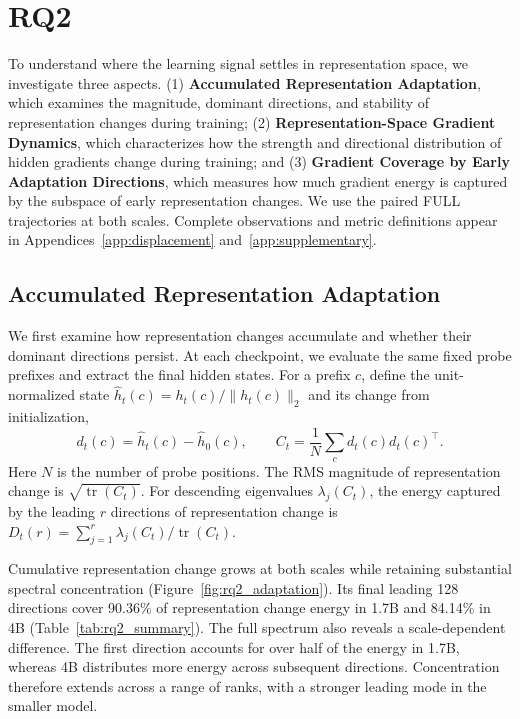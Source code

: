 \section{RQ2}
\label{sec:RQ2}
To understand where the learning signal settles in representation space, we investigate three aspects.
(1) \textbf{Accumulated Representation Adaptation}, which examines the magnitude, dominant directions, and stability of representation changes during training;
(2) \textbf{Representation-Space Gradient Dynamics}, which characterizes how the strength and directional distribution of hidden gradients change during training;
and (3) \textbf{Gradient Coverage by Early Adaptation Directions}, which measures how much gradient energy is captured by the subspace of early representation changes.
We use the paired FULL trajectories at both scales. Complete observations and metric definitions appear in Appendices~\ref{app:displacement} and~\ref{app:supplementary}.

\subsection{Accumulated Representation Adaptation}
\label{sec:rq2_adaptation}
We first examine how representation changes accumulate and whether their dominant directions persist. At each checkpoint, we evaluate the same fixed probe prefixes and extract the final hidden states. For a prefix $c$, define the unit-normalized state $\hat h_t(c)=h_t(c)/\|h_t(c)\|_2$ and its change from initialization,
\begin{equation}
 d_t(c)=\hat h_t(c)-\hat h_0(c),\qquad
 C_t=\frac{1}{N}\sum_c d_t(c)d_t(c)^\top.
 \label{eq:rq2_representation_change}
\end{equation}
Here $N$ is the number of probe positions. The RMS magnitude of representation change is $\sqrt{\operatorname{tr}(C_t)}$. For descending eigenvalues $\lambda_j(C_t)$, the energy captured by the leading $r$ directions of representation change is $D_t(r)=\sum_{j=1}^{r}\lambda_j(C_t)/\operatorname{tr}(C_t)$.

Cumulative representation change grows at both scales while retaining substantial spectral concentration (Figure~\ref{fig:rq2_adaptation}). Its final leading 128 directions cover 90.36\% of representation change energy in 1.7B and 84.14\% in 4B (Table~\ref{tab:rq2_summary}). The full spectrum also reveals a scale-dependent difference. The first direction accounts for over half of the energy in 1.7B, whereas 4B distributes more energy across subsequent directions. Concentration therefore extends across a range of ranks, with a stronger leading mode in the smaller model.

